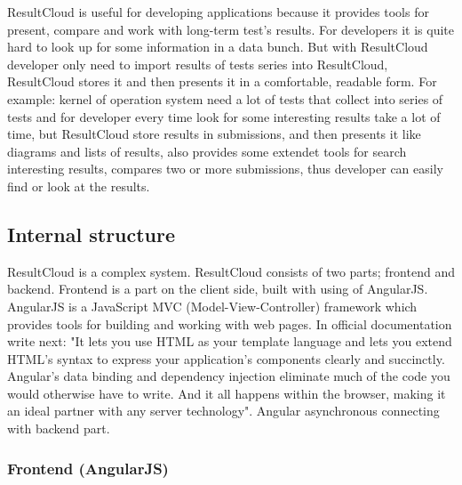 ResultCloud is useful for developing applications because it provides tools for present, compare and work with long-term test's results. For developers it is quite hard to look up for some information in a data bunch. But with ResultCloud developer only need to import results of tests series into ResultCloud, ResultCloud stores it and then presents it in a comfortable, readable form. For example: kernel of operation system need a lot of tests that collect into series of tests and for developer every time look for some interesting results take a lot of time, but ResultCloud store results in submissions, and then presents it like diagrams and lists of results, also provides some extendet tools for search interesting results, compares two or more submissions, thus developer can easily find or look at the results.

\subsection{Internal structure}

ResultCloud is a complex system. ResultCloud consists of two parts; frontend and backend. Frontend is a part on the client side, built with using of AngularJS. AngularJS is a JavaScript MVC (Model-View-Controller) framework which provides tools for building and working with web pages. In official documentation write next: "It lets you use HTML as your template language and lets you extend HTML's syntax to express your application's components clearly and succinctly. Angular's data binding and dependency injection eliminate much of the code you would otherwise have to write. And it all happens within the browser, making it an ideal partner with any server technology"\cite{angularJS}. Angular asynchronous connecting with backend part. 

\subsubsection{Frontend (AngularJS)}

